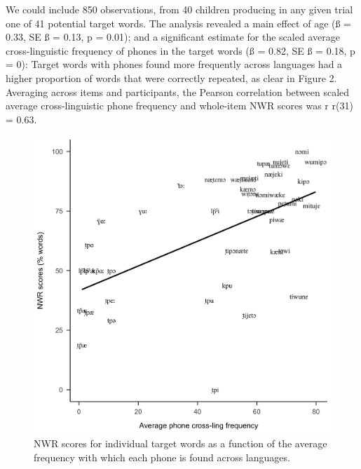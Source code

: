 \documentclass[english,,man,floatsintext]{apa6}
\begin{document}
We could include 850 observations, from 40 children producing in any
given trial one of 41 potential target words. The analysis revealed a
main effect of age (ß = 0.33, SE ß = 0.13, p = 0.01); and a significant
estimate for the scaled average cross-linguistic frequency of phones in
the target words (ß = 0.82, SE ß = 0.18, p = 0): Target words with
phones found more frequently across languages had a higher proportion of
words that were correctly repeated, as clear in Figure 2. Averaging
across items and participants, the Pearson correlation between scaled
average cross-linguistic phone frequency and whole-item NWR scores was r
r(31) = 0.63.

\begin{figure}[!t]

{\centering \includegraphics[width=0.65\linewidth]{nwr.by.freq.ITEM} 

}

\caption{NWR scores for individual target words as a function of the average frequency with which each phone is found across languages.}\label{fig:Fig2-xling-freq}
\end{figure}
\end{document}
